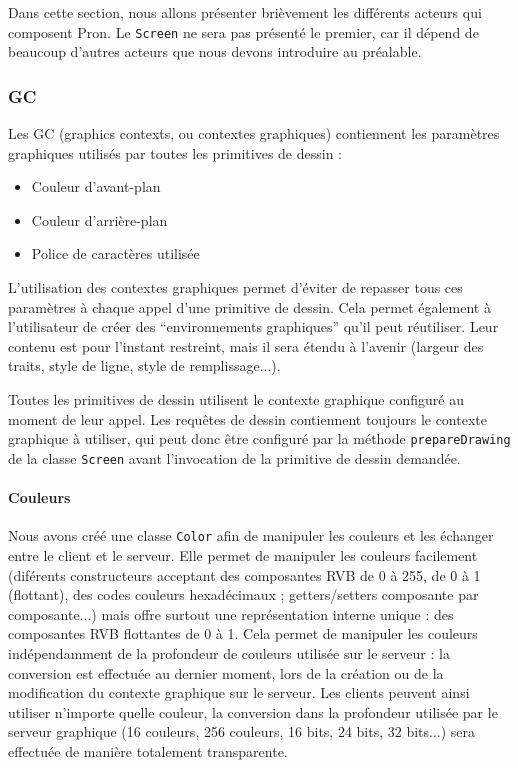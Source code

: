 Dans cette section, nous allons présenter brièvement les différents acteurs qui composent Pron. Le \verb|Screen| ne sera pas présenté le premier, car il dépend de beaucoup d'autres acteurs que nous devons introduire au préalable.

\subsubsection{GC}

Les GC (graphics contexts, ou contextes graphiques) contiennent les paramètres graphiques utilisés par toutes les primitives de dessin :
\begin{itemize}
  \item Couleur d'avant-plan
  \item Couleur d'arrière-plan
  \item Police de caractères utilisée
\end{itemize}

\vspace{1em}

L'utilisation des contextes graphiques permet d'éviter de repasser tous ces paramètres à chaque appel d'une primitive de dessin. Cela permet également à l'utilisateur de créer des ``environnements graphiques'' qu'il peut réutiliser. Leur contenu est pour l'instant restreint, mais il sera étendu à l'avenir (largeur des traits, style de ligne, style de remplissage...).

Toutes les primitives de dessin utilisent le contexte graphique configuré au moment de leur appel. Les requêtes de dessin contiennent toujours le contexte graphique à utiliser, qui peut donc être configuré par la méthode \verb|prepareDrawing| de la classe \verb|Screen| avant l'invocation de la primitive de dessin demandée.

\paragraph{Couleurs}
Nous avons créé une classe \verb|Color| afin de manipuler les couleurs et les échanger entre le client et le serveur. Elle permet de manipuler les couleurs facilement (diférents constructeurs acceptant des composantes RVB de 0 à 255, de 0 à 1 (flottant), des codes couleurs hexadécimaux ; getters/setters composante par composante...) mais offre surtout une représentation interne unique : des composantes RVB flottantes de 0 à 1. Cela permet de manipuler les couleurs indépendamment de la profondeur de couleurs utilisée sur le serveur : la conversion est effectuée au dernier moment, lors de la création ou de la modification du contexte graphique sur le serveur. Les clients peuvent ainsi utiliser n'importe quelle couleur, la conversion dans la profondeur utilisée par le serveur graphique (16 couleurs, 256 couleurs, 16 bits, 24 bits, 32 bits...) sera effectuée de manière totalement transparente.

